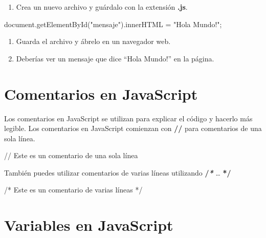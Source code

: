 \documentclass[
  a4paper,
  DIV=11,
  numbers=noendperiod,
  onepage,
  openany]{scrreprt}
\newenvironment{Shaded}{\begin{snugshade}}{\end{snugshade}}
\newcommand{\AttributeTok}[1]{\textcolor[rgb]{0.40,0.45,0.13}{#1}}
\newcommand{\BuiltInTok}[1]{\textcolor[rgb]{0.00,0.23,0.31}{#1}}
\newcommand{\CommentTok}[1]{\textcolor[rgb]{0.37,0.37,0.37}{#1}}
\newcommand{\FunctionTok}[1]{\textcolor[rgb]{0.28,0.35,0.67}{#1}}
\newcommand{\NormalTok}[1]{\textcolor[rgb]{0.00,0.23,0.31}{#1}}
\newcommand{\OperatorTok}[1]{\textcolor[rgb]{0.37,0.37,0.37}{#1}}
\newcommand{\StringTok}[1]{\textcolor[rgb]{0.13,0.47,0.30}{#1}}
\providecommand{\tightlist}{%
  \setlength{\itemsep}{0pt}\setlength{\parskip}{0pt}}\usepackage{longtable,booktabs,array}
\begin{document}
\begin{tcolorbox}
\begin{enumerate}
\def\labelenumi{\arabic{enumi}.}
\setcounter{enumi}{3}
\tightlist
\item
  Crea un nuevo archivo y guárdalo con la extensión \textbf{.js}.
\end{enumerate}

\begin{Shaded}
\begin{Highlighting}[]
\BuiltInTok{document}\OperatorTok{.}\FunctionTok{getElementById}\NormalTok{(}\StringTok{"mensaje"}\NormalTok{)}\OperatorTok{.}\AttributeTok{innerHTML} \OperatorTok{=} \StringTok{"Hola Mundo!"}\OperatorTok{;}
\end{Highlighting}
\end{Shaded}

\begin{enumerate}
\def\labelenumi{\arabic{enumi}.}
\setcounter{enumi}{4}
\item
  Guarda el archivo y ábrelo en un navegador web.
\item
  Deberías ver un mensaje que dice ``Hola Mundo!'' en la página.
\end{enumerate}

\section{Comentarios en JavaScript}\label{comentarios-en-javascript}

Los comentarios en JavaScript se utilizan para explicar el código y
hacerlo más legible. Los comentarios en JavaScript comienzan con
\textbf{//} para comentarios de una sola línea.

\begin{Shaded}
\begin{Highlighting}[]
\CommentTok{// Este es un comentario de una sola línea}
\end{Highlighting}
\end{Shaded}

También puedes utilizar comentarios de varias líneas utilizando
\textbf{/\emph{*}} \ldots{} \textbf{*/}

\begin{Shaded}
\begin{Highlighting}[]
\CommentTok{/*}
\CommentTok{Este es un comentario de varias líneas}
\CommentTok{*/}
\end{Highlighting}
\end{Shaded}

\section{Variables en JavaScript}\label{variables-en-javascript}


\end{tcolorbox}
\end{document}
